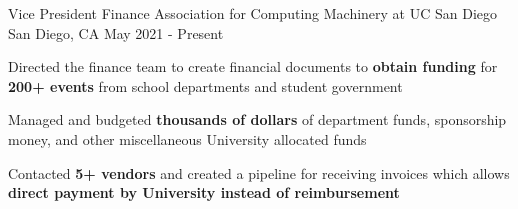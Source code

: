 \begin{cventries}

\cventry
{Vice President Finance}
{Association for Computing Machinery at UC San Diego}
{San Diego, CA}
{May 2021 - Present}
{
\begin{cvitems}
  \item Directed the finance team to create financial documents to \textbf{obtain funding} for \textbf{200+ events} from school departments and student government
  \item Managed and budgeted \textbf{thousands of dollars} of department funds, sponsorship money, and other miscellaneous University allocated funds
  \item Contacted \textbf{5+ vendors} and created a pipeline for receiving invoices which allows \textbf{direct payment by University instead of reimbursement}
\end{cvitems}
}

\end{cventries}